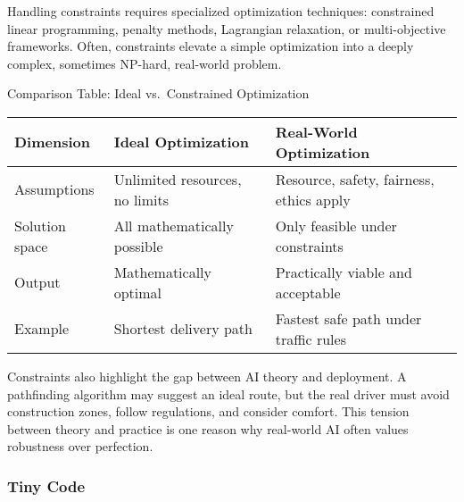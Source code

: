 \documentclass[
  letterpaper,
  DIV=11,
  numbers=noendperiod]{scrreprt}
\begin{document}
Handling constraints requires specialized optimization techniques:
constrained linear programming, penalty methods, Lagrangian relaxation,
or multi-objective frameworks. Often, constraints elevate a simple
optimization into a deeply complex, sometimes NP-hard, real-world
problem.

Comparison Table: Ideal vs.~Constrained Optimization

\begin{longtable}[]{@{}
  >{\raggedright\arraybackslash}p{}
  >{\raggedright\arraybackslash}p{}
  >{\raggedright\arraybackslash}p{}@{}}
\toprule\noalign{}
\begin{minipage}[b]{\linewidth}\raggedright
Dimension
\end{minipage} & \begin{minipage}[b]{\linewidth}\raggedright
Ideal Optimization
\end{minipage} & \begin{minipage}[b]{\linewidth}\raggedright
Real-World Optimization
\end{minipage} \\
\midrule\noalign{}
\endhead
\bottomrule\noalign{}
\endlastfoot
Assumptions & Unlimited resources, no limits & Resource, safety,
fairness, ethics apply \\
Solution space & All mathematically possible & Only feasible under
constraints \\
Output & Mathematically optimal & Practically viable and acceptable \\
Example & Shortest delivery path & Fastest safe path under traffic
rules \\
\end{longtable}

Constraints also highlight the gap between AI theory and deployment. A
pathfinding algorithm may suggest an ideal route, but the real driver
must avoid construction zones, follow regulations, and consider comfort.
This tension between theory and practice is one reason why real-world AI
often values robustness over perfection.

\subsubsection{Tiny Code}\label{tiny-code-69}
\end{document}
